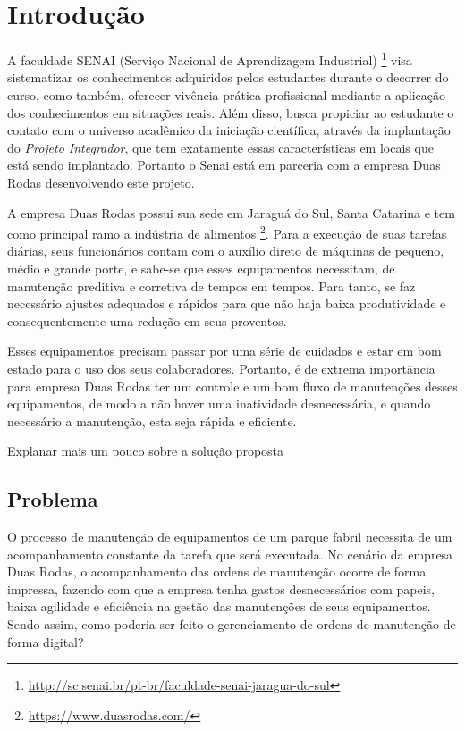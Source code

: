 \chapter{Introdução}

{A faculdade SENAI (Serviço Nacional de Aprendizagem Industrial) \footnote{\url{http://sc.senai.br/pt-br/faculdade-senai-jaragua-do-sul}}  visa sistematizar os conhecimentos adquiridos pelos estudantes durante o decorrer do curso, como também, oferecer vivência  prática-profissional mediante a aplicação dos conhecimentos em situações reais. Além disso, busca  propiciar ao estudante o contato com o universo acadêmico da iniciação científica, através da implantação do \textit{Projeto Integrador}, que tem exatamente essas características em locais que está sendo implantado. Portanto o Senai está em parceria com a empresa Duas Rodas desenvolvendo este projeto. }



A empresa Duas Rodas possui sua sede em Jaraguá do Sul, Santa Catarina e tem como principal ramo a indústria de alimentos \footnote{\url{ https://www.duasrodas.com/}}. Para a execução de suas tarefas diárias, seus funcionários contam com o auxílio direto de máquinas de pequeno, médio e grande porte, e sabe-se que esses equipamentos necessitam, de manutenção preditiva e corretiva  de tempos em tempos. Para tanto, se faz necessário ajustes adequados e rápidos para que não haja baixa produtividade e consequentemente uma redução em seus proventos.

Esses equipamentos precisam passar por uma série de cuidados e estar em bom estado para o uso dos seus colaboradores. Portanto, é de extrema importância para empresa Duas Rodas ter um controle e um bom fluxo de manutenções desses equipamentos, de modo a não haver uma inatividade desnecessária, e quando necessário a manutenção, esta seja rápida e eficiente.

{\color{red}Explanar mais um pouco sobre a solução proposta}

\section{Problema}

O processo de manutenção de equipamentos de um parque fabril necessita de um acompanhamento constante da tarefa que será executada. No cenário da empresa Duas Rodas, o acompanhamento das ordens de manutenção ocorre de forma impressa, fazendo com que a empresa tenha gastos desnecessários com papeis, baixa agilidade e eficiência na gestão das manutenções de seus equipamentos. Sendo assim, como poderia ser feito o gerenciamento de ordens de manutenção de forma digital?

